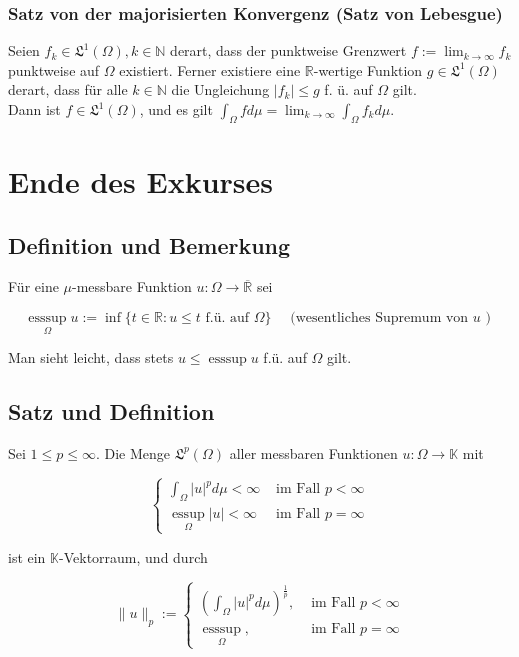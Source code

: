 \documentclass[10pt, letterpaper]{article}
\begin{document}
\subsubsection*{Satz von der majorisierten Konvergenz (Satz von Lebesgue)}
Seien $f_{k} \in \mathfrak{L}^{1}(\Omega), k \in \mathbb{N}$ derart, dass der punktweise Grenzwert $f:=\lim _{k \rightarrow \infty} f_{k}$ punktweise auf $\Omega$ existiert. Ferner existiere eine $\mathbb{R}$-wertige Funktion $g \in \mathfrak{L}^{1}(\Omega)$ derart, dass für alle $k \in \mathbb{N}$ die Ungleichung $\left|f_{k}\right| \leq g$ f. ü. auf $\Omega$ gilt.\\
Dann ist $f \in \mathfrak{L}^{1}(\Omega)$, und es gilt $\int_{\Omega} f d \mu=\lim _{k \rightarrow \infty} \int_{\Omega} f_{k} d \mu$.

\section*{Ende des Exkurses}
\subsection*{Definition und Bemerkung}
Für eine $\mu$-messbare Funktion $u: \Omega \rightarrow \overline{\mathbb{R}}$ sei

$$
\underset{\Omega}{\operatorname{esssup}} u:=\inf \{t \in \mathbb{R}: u \leq t \text { f.ü. auf } \Omega\} \quad \text { (wesentliches Supremum von } u \text { ) }
$$

Man sieht leicht, dass stets $u \leq \operatorname{esssup} u$ f.ü. auf $\Omega$ gilt.

\subsection*{Satz und Definition}
Sei $1 \leq p \leq \infty$. Die Menge $\mathfrak{L}^{p}(\Omega)$ aller messbaren Funktionen $u: \Omega \rightarrow \mathbb{K}$ mit

$$
\begin{cases}\int_{\Omega}|u|^{p} d \mu<\infty & \text { im Fall } p<\infty \\ \underset{\Omega}{\operatorname{essup}}|u|<\infty & \text { im Fall } p=\infty\end{cases}
$$

ist ein $\mathbb{K}$-Vektorraum, und durch

$$
\|u\|_{p}:= \begin{cases}\left(\int_{\Omega}|u|^{p} d \mu\right)^{\frac{1}{p}}, & \text { im Fall } p<\infty \\ \underset{\Omega}{\operatorname{esssup}}, & \text { im Fall } p=\infty\end{cases}
$$
\end{document}
